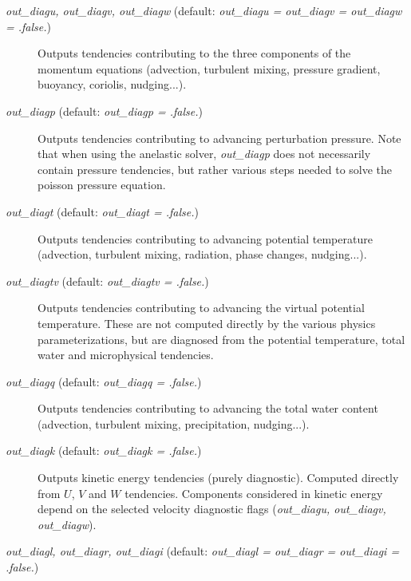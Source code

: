 \documentclass[12pt,A4,french]{article}
\begin{document}
\begin{description}

\item[{\it out\_diagu, out\_diagv, out\_diagw} (default: {\it out\_diagu = out\_diagv = out\_diagw = .false.})]

Outputs tendencies contributing to the three components of the momentum equations (advection, turbulent mixing, pressure gradient, buoyancy, coriolis, nudging...).

\item[{\it out\_diagp} (default: {\it out\_diagp = .false.})]

Outputs tendencies contributing to advancing perturbation pressure. Note that when using the anelastic solver, {\it out\_diagp} does not necessarily contain pressure tendencies, but rather various steps needed to solve the poisson pressure equation.

\item[{\it out\_diagt} (default: {\it out\_diagt = .false.})]

Outputs tendencies contributing to advancing potential temperature (advection, turbulent mixing, radiation, phase changes, nudging...).

\item[{\it out\_diagtv} (default: {\it out\_diagtv = .false.})]

Outputs tendencies contributing to advancing the virtual potential temperature. These are not computed directly by the various physics parameterizations, but are diagnosed from the potential temperature, total water and microphysical tendencies.

\item[{\it out\_diagq} (default: {\it out\_diagq = .false.})]

Outputs tendencies contributing to advancing the total water content (advection, turbulent mixing, precipitation, nudging...).

\item[{\it out\_diagk} (default: {\it out\_diagk = .false.})]

Outputs kinetic energy tendencies (purely diagnostic). Computed directly from $U$, $V$ and $W$ tendencies. Components considered in kinetic energy depend on the selected velocity diagnostic flags ({\it out\_diagu, out\_diagv, out\_diagw}).

\item[{\it out\_diagl, out\_diagr, out\_diagi} (default: {\it out\_diagl = out\_diagr = out\_diagi = .false.})]


\end{description}
\end{document}
